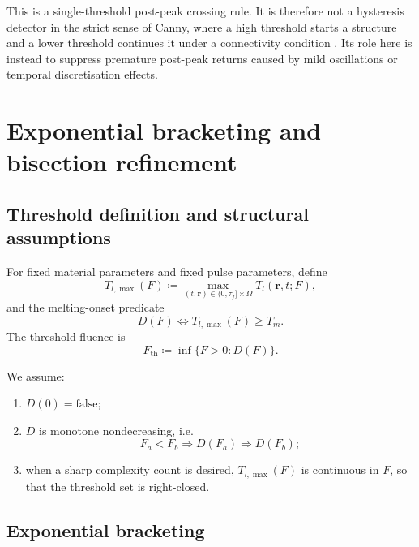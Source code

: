 This is a single-threshold post-peak crossing rule.
It is therefore not a hysteresis detector in the strict sense of Canny,
where a high threshold starts a structure and a lower threshold continues it under a connectivity condition \cite{Canny_1986}.
Its role here is instead to suppress premature post-peak returns caused by mild oscillations or temporal discretisation effects.


\section{Exponential bracketing and bisection refinement}
\label{app:exp-bisection}

\subsection{Threshold definition and structural assumptions}

For fixed material parameters and fixed pulse parameters, define
\begin{equation}
    T_{l,\max}(F)
    \coloneqq
    \max_{(t,\mathbf{r})\in(0,\tau_f]\times\Omega}
    T_l(\mathbf{r},t;F),
    \label{eq:app-tlmax}
\end{equation}
and the melting-onset predicate
\begin{equation}
    D(F)
    \iff
    T_{l,\max}(F)\ge T_m.
    \label{eq:app-damage-predicate}
\end{equation}
The threshold fluence is
\begin{equation}
    F_{\mathrm{th}}
    \coloneqq
    \inf\{F>0 : D(F)\}.
    \label{eq:app-threshold-fluence}
\end{equation}

We assume:
\begin{enumerate}
    \item \(D(0)=\mathrm{false}\);
    \item \(D\) is monotone nondecreasing, i.e.
          \[
              F_a<F_b \Longrightarrow D(F_a)\Rightarrow D(F_b);
          \]
    \item when a sharp complexity count is desired, \(T_{l,\max}(F)\) is continuous in \(F\), so that the threshold set is right-closed.
\end{enumerate}

\subsection{Exponential bracketing}

